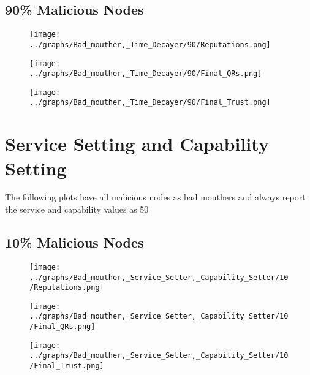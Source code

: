 \documentclass{article}
\begin{document}
    \begin{minipage}[t]{0.49\columnwidth}
    \subsection*{90\% Malicious Nodes}
        \begin{figure}[H]
            \centering
            \texttt{[image: ../graphs/Bad\_mouther,\_Time\_Decayer/90/Reputations.png]}
        \end{figure}
        \begin{figure}[H]
            \centering
            \texttt{[image: ../graphs/Bad\_mouther,\_Time\_Decayer/90/Final\_QRs.png]}
        \end{figure}
    \end{minipage}
    \begin{minipage}[t]{0.49\columnwidth}
        \begin{figure}[H]
            \centering
            \texttt{[image: ../graphs/Bad\_mouther,\_Time\_Decayer/90/Final\_Trust.png]}
        \end{figure}
    \end{minipage}
    \newpage

    \section*{Service Setting and Capability Setting}
    The following plots have all malicious nodes as bad mouthers and always
    report the service and capability values as 50
    \\
  \begin{minipage}[t]{0.49\columnwidth}
    \subsection*{10\% Malicious Nodes}
        \begin{figure}[H]
            \centering
            \texttt{[image: ../graphs/Bad\_mouther,\_Service\_Setter,\_Capability\_Setter/10/Reputations.png]}
        \end{figure}
        \begin{figure}[H]
            \centering
            \texttt{[image: ../graphs/Bad\_mouther,\_Service\_Setter,\_Capability\_Setter/10/Final\_QRs.png]}
        \end{figure}
    \end{minipage}
    \begin{minipage}[t]{0.49\columnwidth}
        \begin{figure}[H]
            \centering
            \texttt{[image: ../graphs/Bad\_mouther,\_Service\_Setter,\_Capability\_Setter/10/Final\_Trust.png]}
        \end{figure}
    \end{minipage}
\end{document}

